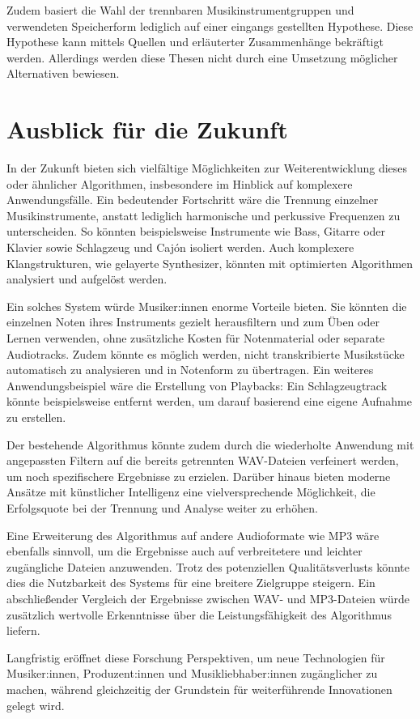 \par

Zudem basiert die Wahl der trennbaren Musikinstrumentgruppen und verwendeten Speicherform lediglich auf einer eingangs gestellten Hypothese.
Diese Hypothese kann mittels Quellen und erläuterter Zusammenhänge bekräftigt werden.
Allerdings werden diese Thesen nicht durch eine Umsetzung möglicher Alternativen bewiesen.

%
\section{Ausblick für die Zukunft}
%

In der Zukunft bieten sich vielfältige Möglichkeiten zur Weiterentwicklung dieses oder ähnlicher Algorithmen, insbesondere im Hinblick auf komplexere Anwendungsfälle. Ein bedeutender Fortschritt wäre die Trennung einzelner Musikinstrumente, anstatt lediglich harmonische und perkussive Frequenzen zu unterscheiden. So könnten beispielsweise Instrumente wie Bass, Gitarre oder Klavier sowie Schlagzeug und Cajón isoliert werden. Auch komplexere Klangstrukturen, wie gelayerte Synthesizer, könnten mit optimierten Algorithmen analysiert und aufgelöst werden.

Ein solches System würde Musiker:innen enorme Vorteile bieten. Sie könnten die einzelnen Noten ihres Instruments gezielt herausfiltern und zum Üben oder Lernen verwenden, ohne zusätzliche Kosten für Notenmaterial oder separate Audiotracks. Zudem könnte es möglich werden, nicht transkribierte Musikstücke automatisch zu analysieren und in Notenform zu übertragen. Ein weiteres Anwendungsbeispiel wäre die Erstellung von Playbacks: Ein Schlagzeugtrack könnte beispielsweise entfernt werden, um darauf basierend eine eigene Aufnahme zu erstellen.

Der bestehende Algorithmus könnte zudem durch die wiederholte Anwendung mit angepassten Filtern auf die bereits getrennten WAV-Dateien verfeinert werden, um noch spezifischere Ergebnisse zu erzielen. Darüber hinaus bieten moderne Ansätze mit künstlicher Intelligenz eine vielversprechende Möglichkeit, die Erfolgsquote bei der Trennung und Analyse weiter zu erhöhen.

Eine Erweiterung des Algorithmus auf andere Audioformate wie MP3 wäre ebenfalls sinnvoll, um die Ergebnisse auch auf verbreitetere und leichter zugängliche Dateien anzuwenden. Trotz des potenziellen Qualitätsverlusts könnte dies die Nutzbarkeit des Systems für eine breitere Zielgruppe steigern. Ein abschließender Vergleich der Ergebnisse zwischen WAV- und MP3-Dateien würde zusätzlich wertvolle Erkenntnisse über die Leistungsfähigkeit des Algorithmus liefern.

Langfristig eröffnet diese Forschung Perspektiven, um neue Technologien für Musiker:innen, Produzent:innen und Musikliebhaber:innen zugänglicher zu machen, während gleichzeitig der Grundstein für weiterführende Innovationen gelegt wird.
